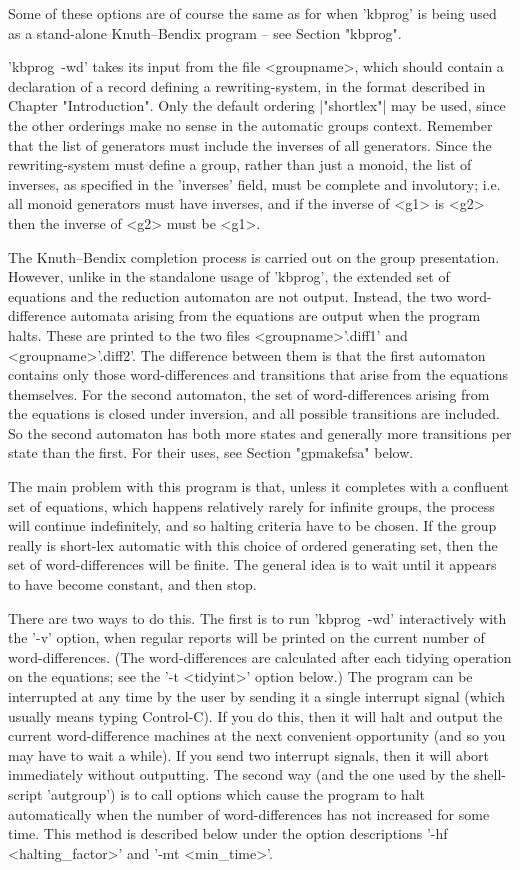 Some of these options are of course the same as for when 'kbprog' is being
used as a stand-alone Knuth--Bendix program -- see Section "kbprog".

'kbprog\ -wd' takes its input from the file <groupname>, which should contain a
declaration of a record defining a rewriting-system, in the format described
in Chapter "Introduction". Only the default ordering |"shortlex"| may be used,
since the other orderings make no sense in the automatic groups context.
Remember that the list of generators must include the inverses of all
generators.  Since the rewriting-system must define a group, rather than just
a monoid, the list of inverses, as specified in the 'inverses' field, must be
complete and involutory; i.e. all monoid generators must have inverses, and if
the inverse of <g1> is <g2> then the inverse of <g2> must be <g1>.

The Knuth--Bendix completion process is carried out on the group presentation.
However, unlike in the standalone usage of 'kbprog', the extended set of
equations and the reduction automaton are not output. Instead, the two
word-difference automata arising from the equations are output when the program
halts. These are printed to the two files <groupname>'.diff1' and
<groupname>'.diff2'. The difference between them is that the first automaton
contains only those word-differences and transitions that arise from the
equations themselves. For the second automaton, the set of word-differences
arising from the equations is closed under inversion, and all possible
transitions are included. So the second automaton has both more states and
generally more transitions per state than the first. For their uses, see
Section "gpmakefsa" below.

The main problem with this program is that, unless it completes with a
confluent set of equations, which happens relatively rarely for infinite groups,
the process will continue indefinitely, and so halting criteria have to be
chosen. If the group really is short-lex automatic with this choice of
ordered generating set, then the set of word-differences will be finite.
The general idea is to wait until it appears to have become constant, and
then stop.

There are two ways to do this. The first is to run 'kbprog\ -wd'
interactively with the '-v' option, when regular reports will be printed
on the current number of word-differences. (The word-differences are
calculated after each tidying operation on the equations; see the
'-t <tidyint>' option below.) The program can be interrupted at any time by the
user by sending it a single interrupt signal (which usually means typing
Control-C).  If you do this, then it will halt and output the current 
word-difference machines at the next convenient
opportunity (and so you may have to wait a while). If you send two interrupt
signals, then it will abort immediately without outputting.
The second way (and the one used by the shell-script 'autgroup') is to call
options which cause the program to halt automatically when the number of
word-differences has not increased for some time. This method is described
below under the option descriptions  '-hf <halting\_factor>' and
'-mt <min\_time>'.

